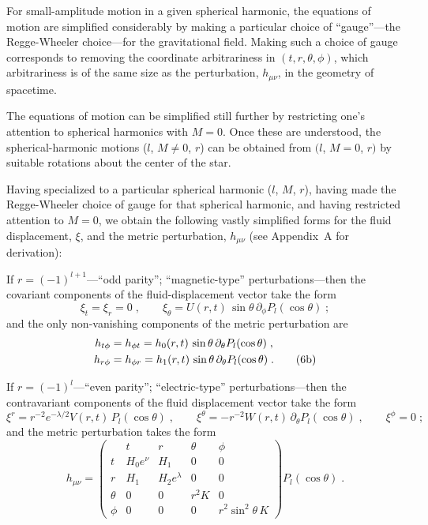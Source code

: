 \documentclass[12pt]{article}
\begin{document}
For small-amplitude motion in a given spherical harmonic, the equations of motion
are simplified considerably by making a particular choice of ``gauge''---the Regge-Wheeler
choice---for the gravitational field. Making such a choice of gauge corresponds to removing
the coordinate arbitrariness in $(t, r, \theta, \phi)$, which arbitrariness is of the same
size as the perturbation, $h_{\mu\nu}$, in the geometry of spacetime.

The equations of motion can be simplified still further by restricting one's attention
to spherical harmonics with $M = 0$. Once these are understood, the spherical-harmonic
motions ($l$, $M \neq 0$, $r$) can be obtained from $(l$, $M = 0$, $r)$ by suitable rotations about
the center of the star.

Having specialized to a particular spherical harmonic ($l$, $M$, $r$), having made the
Regge-Wheeler choice of gauge for that spherical harmonic, and having restricted attention
to $M = 0$, we obtain the following vastly simplified forms for the fluid displacement,
$\xi$, and the metric perturbation, $h_{\mu\nu}$ (see Appendix~A for derivation):

If $r = (-1)^{l+1}$---``odd parity''; ``magnetic-type'' perturbations---then the covariant
components of the fluid-displacement vector take the form
\begin{equation}
  \xi_{t} = \xi_{r} = 0 \;, \qquad
  \xi_{\theta} = U(r,t)\,\sin\theta\,\partial_{\phi} P_{l}(\cos\theta) \;;
\label{eq:6a}\tag{6a}
\end{equation}
and the only non-vanishing components of the metric perturbation are
\begin{align}
  h_{t\phi} &= h_{\phi t} = h_{0}(r,t)\,\sin\theta\,\partial_{\theta} P_{l}(\cos\theta) \;,\notag\\
  h_{r\phi} &= h_{\phi r} = h_{1}(r,t)\,\sin\theta\,\partial_{\theta} P_{l}(\cos\theta) \;.
\label{eq:6b}\tag{6b}
\end{align}

If $r = (-1)^{l}$---``even parity''; ``electric-type'' perturbations---then the contravariant
components of the fluid displacement vector take the form
\begin{equation}
  \xi^{r} = r^{-2} e^{-\lambda/2} V(r,t)\, P_{l}(\cos\theta) \;, \qquad
  \xi^{\theta} = -r^{-2} W(r,t)\,\partial_{\theta} P_{l}(\cos\theta) \;, \qquad
  \xi^{\phi} = 0 \;;
\label{eq:7a}\tag{7a}
\end{equation}
and the metric perturbation takes the form
\begin{equation}
  h_{\mu\nu} =
  \left(
  \begin{array}{c|cccc}
     & t & r & \theta & \phi \\
    \hline
    t & H_{0} e^{\nu} & H_{1} & 0 & 0 \\
    r & H_{1} & H_{2} e^{\lambda} & 0 & 0 \\
    \theta & 0 & 0 & r^{2} K & 0 \\
    \phi & 0 & 0 & 0 & r^{2} \sin^{2}\!\theta\, K
  \end{array}
  \right)
  P_{l}(\cos\theta) \;.
\label{eq:7b}\tag{7b}
\end{equation}
\end{document}
